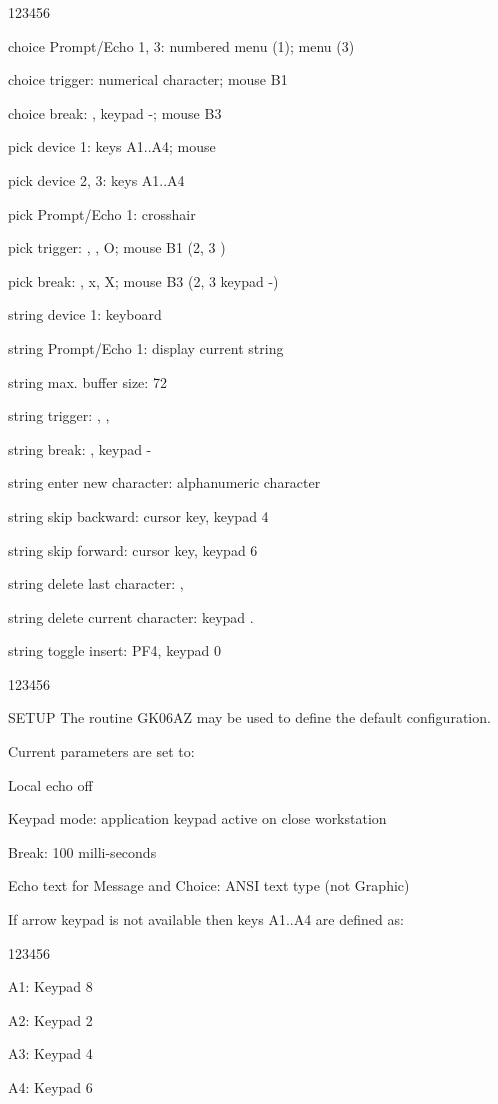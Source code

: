 \begin{DLtt}{123456}
\item[choice Prompt/Echo 1, 3:]numbered menu (1); menu (3)
\item[choice trigger:]numerical character; mouse B1
\item[choice break:], keypad -; mouse B3
\item[pick device 1:]keys A1..A4; mouse
\item[pick device 2, 3:]keys A1..A4
\item[pick Prompt/Echo 1:]crosshair
\item[pick trigger:], , O; mouse B1 (2, 3 )
\item[pick break:], x, X; mouse B3 (2, 3 keypad -)
\item[string device 1:]keyboard
\item[string Prompt/Echo 1:]display current string
\item[string max. buffer size:]72
\item[string trigger:], , 
\item[string break:], keypad -
\item[string enter new character:]alphanumeric character
\item[string skip backward:]cursor key, keypad 4
\item[string skip forward:]cursor key, keypad 6
\item[string delete last character:], 
\item[string delete current character:]keypad .
\item[string toggle insert:]PF4, keypad 0
\end{DLtt}
\begin{DLtt}{123456}
\item[SETUP]The routine GK06AZ may be used to define the default
configuration.
\item[Current parameters are set to:]
\item[Local echo]off
\item[Keypad mode:]application keypad active on close workstation
\item[Break:]100 milli-seconds
\item[Echo text for Message and Choice:]ANSI text type (not Graphic)
\end{DLtt}
If arrow keypad is not available then keys A1..A4 are defined as:
\begin{DLtt}{123456}
\item[A1:]Keypad 8
\item[A2:]Keypad 2
\item[A3:]Keypad 4
\item[A4:]Keypad 6
\end{DLtt}
